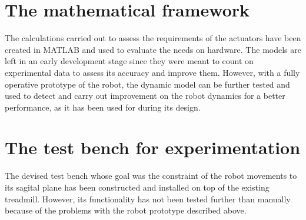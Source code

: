 \section{The mathematical framework} %
\label{sec:the_mathematical_framework}
The calculations carried out to assess the requirements of the actuators have been created in MATLAB and used to evaluate the needs on hardware.
The models are left in an early development stage since they were meant to count on experimental data to assess its accuracy and improve them.
However, with a fully operative prototype of the robot, the dynamic model can be further tested and used to detect and carry out improvement on the robot dynamics for a better performance, as it has been used for during its design. 

\section{The test bench for experimentation} %
\label{sec:the_test_bench}
The devised test bench whose goal was the constraint of the robot movements to its sagital plane has been constructed and installed on top of the existing treadmill.
However, its functionality has not been tested further than manually because of the problems with the robot prototype described above.
